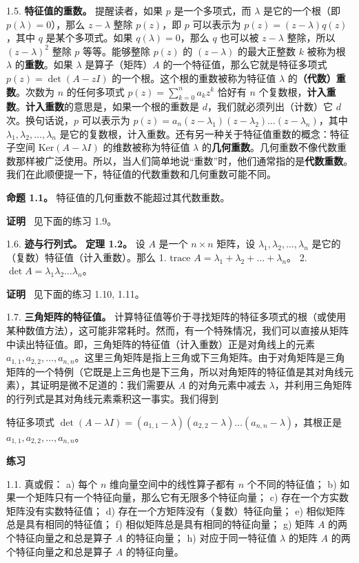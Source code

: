 1.5. \textbf{特征值的重数。} 提醒读者，如果 $p$ 是一个多项式，而 $\lambda$ 是它的一个根（即 $p(\lambda) = 0$），那么 $z - \lambda$ 整除 $p(z)$，即 $p$ 可以表示为 $p(z) = (z - \lambda)q(z)$，其中 $q$ 是某个多项式。如果 $q(\lambda) = 0$，那么 $q$ 也可以被 $z - \lambda$ 整除，所以 $(z - \lambda)^2$ 整除 $p$ 等等。能够整除 $p(z)$ 的 $(z - \lambda)$ 的最大正整数 $k$ 被称为根 $\lambda$ 的\textbf{重数}。如果 $\lambda$ 是算子（矩阵）$A$ 的一个特征值，那么它就是特征多项式 $p(z) = \det(A - zI)$ 的一个根。这个根的重数被称为特征值 $\lambda$ 的\textbf{（代数）重数}。次数为 $n$ 的任何多项式 $p(z) = \sum_{k=0}^n a_k z^k$ 恰好有 $n$ 个复数根，\textbf{计入重数}。\textbf{计入重数}的意思是，如果一个根的重数是 $d$，我们就必须列出（计数）它 $d$ 次。换句话说，$p$ 可以表示为 $p(z) = a_n (z - \lambda_1)(z - \lambda_2)\dots(z - \lambda_n)$，其中 $\lambda_1, \lambda_2, \dots, \lambda_n$ 是它的复数根，计入重数。还有另一种关于特征值重数的概念：特征子空间 $\text{Ker}(A - \lambda I)$ 的维数被称为特征值 $\lambda$ 的\textbf{几何重数}。几何重数不像代数重数那样被广泛使用。所以，当人们简单地说“重数”时，他们通常指的是\textbf{代数重数}。我们在此顺便提一下，特征值的代数重数和几何重数可能不同。

\textbf{命题 1.1。} 特征值的几何重数不能超过其代数重数。

\textbf{证明}~ 见下面的练习 1.9。

1.6. \textbf{迹与行列式。}
\textbf{定理 1.2。} 设 $A$ 是一个 $n \times n$ 矩阵，设 $\lambda_1, \lambda_2, \dots, \lambda_n$ 是它的（复数）特征值（计入重数）。那么
1. $\text{trace } A = \lambda_1 + \lambda_2 + \dots + \lambda_n$。
2. $\det A = \lambda_1 \lambda_2 \dots \lambda_n$。

\textbf{证明}~ 见下面的练习 1.10, 1.11。

1.7. \textbf{三角矩阵的特征值。} 计算特征值等价于寻找矩阵的特征多项式的根（或使用某种数值方法），这可能非常耗时。然而，有一个特殊情况，我们可以直接从矩阵中读出特征值。即，三角矩阵的特征值（计入重数）正是对角线上的元素 $a_{1,1}, a_{2,2}, \dots, a_{n,n}$。这里三角矩阵是指上三角或下三角矩阵。由于对角矩阵是三角矩阵的一个特例（它既是上三角也是下三角，所以对角矩阵的特征值是其对角线元素），其证明是微不足道的：我们需要从 $A$ 的对角元素中减去 $\lambda$，并利用三角矩阵的行列式是其对角线元素乘积这一事实。我们得到


特征多项式 $\det(A - \lambda I) = (a_{1,1} - \lambda)(a_{2,2} - \lambda)\dots(a_{n,n} - \lambda)$，其根正是 $a_{1,1}, a_{2,2}, \dots, a_{n,n}$。

\textbf{练习}~

1.1. 真或假：
a) 每个 $n$ 维向量空间中的线性算子都有 $n$ 个不同的特征值；
b) 如果一个矩阵只有一个特征向量，那么它有无限多个特征向量；
c) 存在一个方实数矩阵没有实数特征值；
d) 存在一个方矩阵没有（复数）特征向量；
e) 相似矩阵总是具有相同的特征值；
f) 相似矩阵总是具有相同的特征向量；
g) 矩阵 $A$ 的两个特征向量之和总是算子 $A$ 的特征向量；
h) 对应于同一特征值 $\lambda$ 的矩阵 $A$ 的两个特征向量之和总是算子 $A$ 的特征向量。

